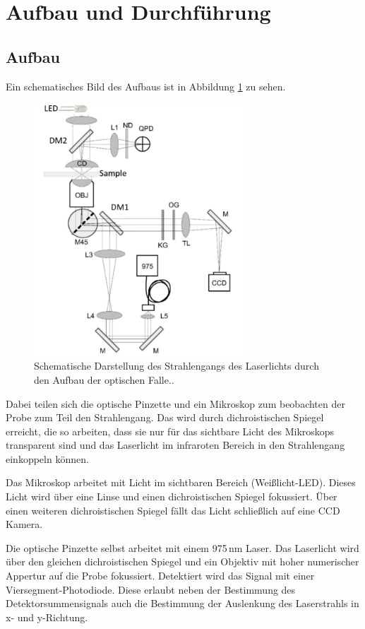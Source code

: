 \newpage
\section{Aufbau und Durchführung}
\subsection{Aufbau}
Ein schematisches Bild des Aufbaus ist in Abbildung \ref{fig:Aufbau} zu sehen.
\begin{figure}[H]
    \centering\captionsetup{format=plain}
    \includegraphics[width=0.7\textwidth]{Bilder/OP_Schema.png}
    \caption{Schematische Darstellung des Strahlengangs des Laserlichts durch den Aufbau der optischen Falle.\cite{ref10}.}
    \label{fig:Aufbau}
\end{figure}
Dabei teilen sich die optische Pinzette und ein Mikroskop zum beobachten der Probe 
zum Teil den Strahlengang. Das wird durch 
dichroistischen Spiegel erreicht, die so arbeiten, dass sie  nur für das sichtbare Licht des
Mikroskops transparent sind und das Laserlicht im infraroten Bereich in den Strahlengang einkoppeln können.


Das Mikroskop arbeitet mit Licht im sichtbaren Bereich (Weißlicht-LED).
Dieses Licht wird über eine Linse und einen dichroistischen Spiegel fokussiert.
Über einen weiteren dichroistischen Spiegel fällt das Licht schließlich auf eine CCD Kamera.


Die optische Pinzette selbst arbeitet mit einem 975$\,$nm Laser.
Das Laserlicht wird über den gleichen dichroistischen Spiegel und ein 
Objektiv mit hoher numerischer Appertur auf die Probe fokussiert.
Detektiert wird das Signal mit einer Viersegment-Photodiode. 
Diese erlaubt neben der Bestimmung des Detektorsummensignals auch die Bestimmung der Auslenkung des Laserstrahls in x- und y-Richtung.


